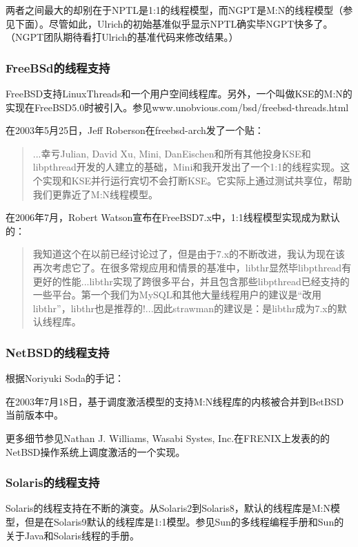 \documentclass[12pt, twoside, a4paper, xetex]{report}
\begin{document}
	两者之间最大的却别在于NPTL是1:1的线程模型，而NGPT是M:N的线程模型（参见下面）。尽管如此，Ulrich的初始基准似乎显示NPTL确实毕NGPT快多了。（NGPT团队期待看打Ulrich的基准代码来修改结果。）

\subsubsection*{FreeBSd的线程支持}
	
	FreeBSD支持LinuxThreads和一个用户空间线程库。另外，一个叫做KSE的M:N的实现在FreeBSD5.0时被引入。参见www.unobvious.com/bsd/freebsd-threads.html

	在2003年5月25日，Jeff Roberson在freebsd-arch发了一个贴：
	\begin{quotation}
		...幸亏Julian, David Xu, Mini, DanEischen和所有其他投身KSE和libpthread开发的人建立的基础，Mini和我开发出了一个1:1的线程实现。这个实现和KSE并行运行宾切不会打断KSE。它实际上通过测试共享位，帮助我们更靠近了M:N线程模型。
	\end{quotation}

	在2006年7月，Robert Watson宣布在FreeBSD7.x中，1:1线程模型实现成为默认的：

	\begin{quotation}
		我知道这个在以前已经讨论过了，但是由于7.x的不断改进，我认为现在该再次考虑它了。在很多常规应用和情景的基准中，libthr显然毕libpthread有更好的性能...libthr实现了跨很多平台，并且包含那些libpthread已经支持的一些平台。第一个我们为MySQL和其他大量线程用户的建议是“改用libthr”，libthr也是推荐的!...因此strawman的建议是：是libthr成为7.x的默认线程库。
	\end{quotation}

\subsubsection*{NetBSD的线程支持}
		根据Noriyuki Soda的手记：
		
		在2003年7月18日，基于调度激活模型的支持M:N线程库的内核被合并到BetBSD当前版本中。

		更多细节参见Nathan J. Williams, Wasabi Systes, Inc.在FRENIX上发表的的NetBSD操作系统上调度激活的一个实现。
\subsubsection*{Solaris的线程支持}
	
	Solaris的线程支持在不断的演变。从Solaris2到Solaris8，默认的线程库是M:N模型，但是在Solaris9默认的线程库是1:1模型。参见Sun的多线程编程手册和Sun的关于Java和Solaris线程的手册。
\end{document}
